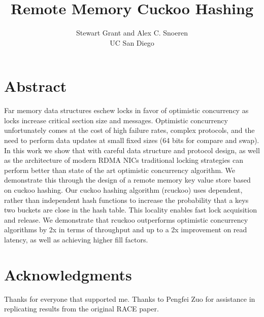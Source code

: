 \documentclass[10pt,twocolumn]{article}
\begin{document}
\title{Remote Memory Cuckoo Hashing}
\author{Stewart Grant and Alex C. Snoeren\\ UC San Diego}
\date{}

\maketitle

\section*{Abstract}

Far memory data structures eschew locks in favor of
optimistic concurrency as locks increase critical section
size and messages. Optimistic concurrency unfortunately
comes at the cost of high failure rates, complex protocols,
and the need to perform data updates at small fixed sizes
(64 bits for compare and swap). In this work we show that
with careful data structure and protocol design, as well as
the architecture of modern RDMA NICs traditional locking
strategies can perform better than state of the art
optimistic concurrency algorithm. We demonstrate this
through the design of a remote memory key value store based
on cuckoo hashing. Our cuckoo hashing algorithm (rcuckoo)
uses dependent, rather than independent hash functions to
increase the probability that a keys two buckets are close
in the hash table. This locality enables fast lock
acquisition and release. We demonstrate that rcuckoo
outperforms optimistic concurrency algorithms by 2x in
terms of throughput and up to a 2x improvement on read
latency, as well as achieving higher fill factors.



\section*{Acknowledgments}

Thanks for everyone that supported me. Thanks to Pengfei Zuo
for assistance in replicating results from the original RACE
paper.


\balance
\vspace{-0.3cm}
{\footnotesize 
}
\vspace{-0.5cm}
\end{document}
